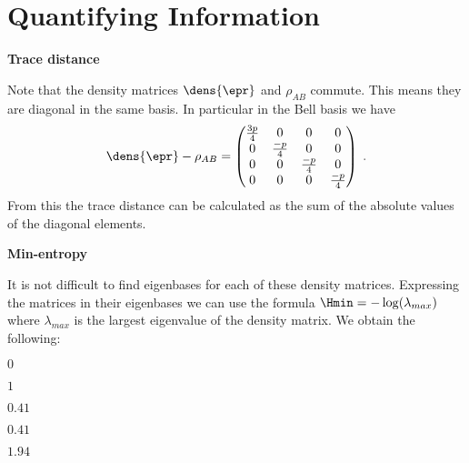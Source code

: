 
\chapter{Quantifying Information}

\begin{exercises}


\item {\bf Trace distance}

Note that the density matrices \(\dens{\epr}\) and \(\rho_{AB}\) commute. This means they are diagonal in the same basis. In particular in the Bell basis we have
\[\dens{\epr} - \rho_{AB} = \begin{pmatrix} \frac{3p}{4} &0 &  0 & 0\\ 0 & \frac{-p}{4} & 0 & 0\\ 0&0 & \frac{-p}{4} & 0\\  0& 0& 0 & \frac{-p}{4}\end{pmatrix}\;.\]
From this the trace distance can be calculated as the sum of the absolute values of the diagonal elements.


\item {\bf Min-entropy}

It is not difficult to find eigenbases for each of these density matrices. Expressing the matrices in their eigenbases we can use the formula \(\Hmin = -\log(\lambda_{max})\) where \(\lambda_{max}\) is the largest eigenvalue of the density matrix. We obtain the following: 
\begin{statements}
\item $0$
\item $1$
\item $0.41$
\item $0.41$
\item $1.94$
\end{statements}



\end{exercises}

